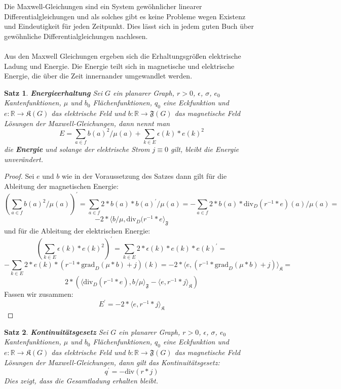 \documentclass[11pt,a4paper,leqno]{report}
\newtheorem{proposition}{Satz}[chapter]
\numberwithin{equation}{chapter}
\begin{document}
\noindent
Die Maxwell-Gleichungen sind ein System gew\"ohnlicher linearer Differentialgleichungen und als solches gibt es keine Probleme wegen Existenz und Eindeutigkeit f\"ur jeden Zeitpunkt. Dies l\"asst sich in jedem guten Buch \"uber gew\"ohnliche Differentialgleichungen nachlesen.\\
\\
Aus den Maxwell Gleichungen ergeben sich die Erhaltungsgr\"o\ss{}en elektrische Ladung und Energie. Die Energie teilt sich in magnetische und elektrische Energie, die \"uber die Zeit innernander umgewandlet werden.
\begin{proposition}\textbf{Energieerhaltung}
	Sei $G$ ein planarer Graph, $r>0$, $\epsilon$, $\sigma$, $e_0$ Kantenfunktionen, $\mu$ und $b_0$ Fl\"achenfunktionen, $q_0$ eine Eckfunktion und  $e:\mathbb{R}\rightarrow\mathfrak{K}(G)$ das elektrische Feld und $b:\mathbb{R}\rightarrow\mathfrak{F}(G)$ das magnetische Feld L\"osungen der Maxwell-Gleichungen, dann nennt man 
	$$E = \sum_{a\in f} b(a)^2 /\mu(a) + \sum_{k\in E} \epsilon(k) * e(k)^2 $$
	die \textbf{Energie} und solange der elektrische Strom $j\equiv 0$ gilt, bleibt die Energie unver\"andert. 
\end{proposition}
\begin{proof}
	Sei $e$ und $b$ wie in der Voraussetzung des Satzes dann gilt f\"ur die Ableitung der magnetischen Energie:
	$$(\sum_{a\in f} b(a)^2 /\mu(a))^\prime = \sum_{a\in f} 2 * b(a) * b(a)^\prime /\mu(a) = -\sum_{a\in f} 2 * b(a) * \text{div}_D(r^{-1} * e)(a) /\mu(a)=$$
	$$-2 * \langle b /\mu, \text{div}_D(r^{-1} * e\rangle_{\mathfrak{F}}$$
	und f\"ur die Ableitung der elektrischen Energie:
	$$(\sum_{k\in E} \epsilon(k) * e(k)^2)^\prime = \sum_{k\in E} 2 * \epsilon(k) * e(k) * e(k)^\prime = $$
	$$-\sum_{k\in E} 2 * e(k) * (r^{-1} * \text{grad}_D(\mu * b) + j) (k)=-2 * \langle e, (r^{-1} * \text{grad}_D(\mu * b) + j) \rangle_{\mathfrak{K}}=$$
	$$2 * (\langle \text{div}_D(r^{-1} * e), b /\mu\rangle_{\mathfrak{F}} - \langle e, r^{-1} * j\rangle_{\mathfrak{K}})$$
	Fassen wir zusammen:
	$$E^\prime = -2 * \langle e, r^{-1} * j\rangle_{\mathfrak{K}}$$
\end{proof}
\begin{proposition}\textbf{Kontinuit\"atsgesetz}
	Sei $G$ ein planarer Graph, $r>0$, $\epsilon$, $\sigma$, $e_0$ Kantenfunktionen, $\mu$ und $b_0$ Fl\"achenfunktionen, $q_0$ eine Eckfunktion und  $e:\mathbb{R}\rightarrow\mathfrak{K}(G)$ das elektrische Feld und $b:\mathbb{R}\rightarrow\mathfrak{F}(G)$ das magnetische Feld L\"osungen der Maxwell-Gleichungen, dann gilt das Kontinuit\"atsgesetz:
	$$q^\prime = - \text{div}(r*j)$$
	Dies zeigt, dass die Gesamtladung erhalten bleibt.
\end{proposition}
\end{document}

